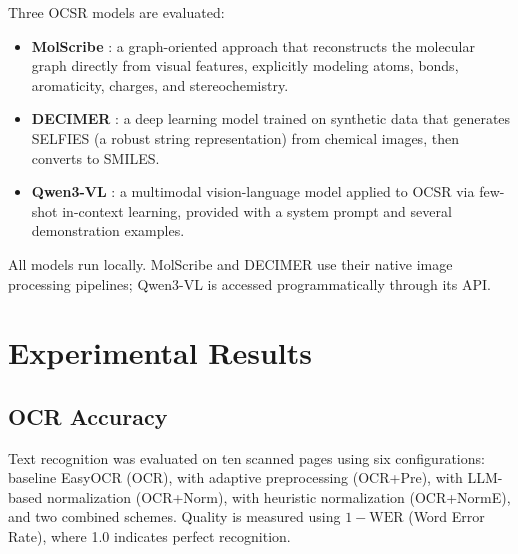 \documentclass[conference]{IEEEtran}
\begin{document}
Three OCSR models are evaluated:
\begin{itemize}
\item \textbf{MolScribe} \cite{refMolScribeEn}: a graph-oriented approach that reconstructs the molecular graph directly from visual features, explicitly modeling atoms, bonds, aromaticity, charges, and stereochemistry.
\item \textbf{DECIMER} \cite{refDECIMEREn,refDECIMERJournalEn}: a deep learning model trained on synthetic data that generates SELFIES (a robust string representation) from chemical images, then converts to SMILES.
\item \textbf{Qwen3-VL} \cite{refQwen3VLEn}: a multimodal vision-language model applied to OCSR via few-shot in-context learning, provided with a system prompt and several demonstration examples.
\end{itemize}
All models run locally. MolScribe and DECIMER use their native image processing pipelines; Qwen3-VL is accessed programmatically through its API.

\section{Experimental Results}

\subsection{OCR Accuracy}

Text recognition was evaluated on ten scanned pages using six configurations: baseline EasyOCR (OCR), with adaptive preprocessing (OCR+Pre), with LLM-based normalization (OCR+Norm), with heuristic normalization (OCR+NormE), and two combined schemes. Quality is measured using $1 - \text{WER}$ (Word Error Rate), where 1.0 indicates perfect recognition.
\end{document}

